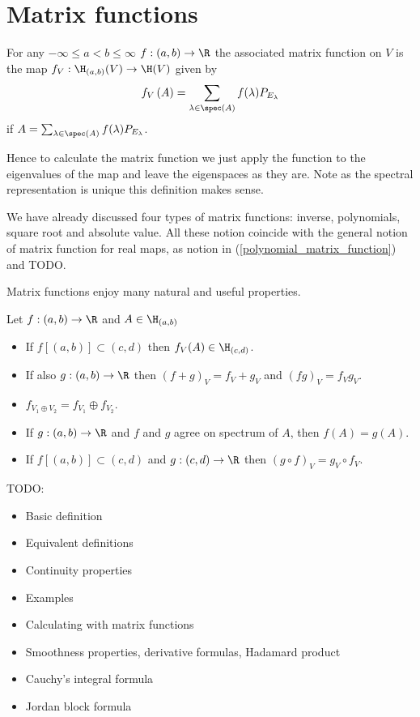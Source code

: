 \chapter{Matrix functions}

\begin{maar}
	For any $-\infty \leq a < b \leq \infty$ $f : (a, b) \to \R$ the associated matrix function on $V$ is the map $f_{V} : \H_{(a, b)}(V) \to \H(V)$ given by
	\[
		f_{V}\left(A\right) = \sum_{\lambda \in \spec(A)} f(\lambda) P_{E_{\lambda}}
	\]
	if $A = \sum_{\lambda \in \spec(A)} f(\lambda) P_{E_{\lambda}}$.
\end{maar}
Hence to calculate the matrix function we just apply the function to the eigenvalues of the map and leave the eigenspaces as they are. Note as the spectral representation is unique this definition makes sense.

We have already discussed four types of matrix functions: inverse, polynomials, square root and absolute value. All these notion coincide with the general notion of matrix function for real maps, as notion in (\ref{polynomial_matrix_function}) and TODO.

Matrix functions enjoy many natural and useful properties.

\begin{prop}
	Let $f : (a,b) \to \R$ and $A \in \H_{(a, b)}$
	\begin{itemize}
		\item If $f[(a, b)] \subset (c, d)$ then $f_{V}(A) \in \H_{(c, d)}$.
		\item If also $g : (a, b) \to \R$ then $(f + g)_{V} = f_{V} + g_{V}$ and $(fg)_{V} = f_{V}g_{V}$.
		\item $f_{V_{1} \oplus V_{2}} = f_{V_{1}} \oplus f_{V_{2}}$.
		\item If $g : (a, b) \to \R$ and $f$ and $g$ agree on spectrum of $A$, then $f(A) = g(A)$.
		\item If $f[(a, b)] \subset (c, d)$ and $g : (c, d) \to \R$ then $(g \circ f)_{V} = g_{V} \circ f_{V}$.
	\end{itemize}
\end{prop}

TODO:
\begin{itemize}
	\item Basic definition
	\item Equivalent definitions
	\item Continuity properties
	\item Examples
	\item Calculating with matrix functions
	\item Smoothness properties, derivative formulas, Hadamard product
	\item Cauchy's integral formula
	\item Jordan block formula
\end{itemize}
